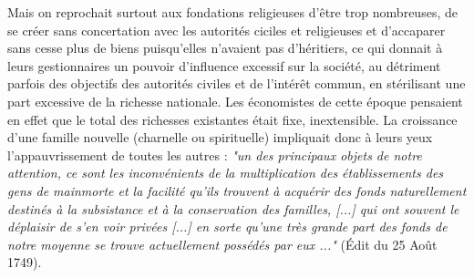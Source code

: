  Mais on reprochait surtout aux fondations religieuses d'être trop nombreuses, de se créer sans concertation avec les autorités ciciles et religieuses et d'accaparer sans cesse plus de biens puisqu'elles n'avaient pas d'héritiers, ce qui donnait à leurs gestionnaires un pouvoir d'influence excessif sur la société, au détriment parfois des objectifs des autorités civiles et de l'intérêt commun, en stérilisant une part excessive de la richesse nationale. Les économistes de cette époque pensaient en effet que le total des richesses existantes était fixe, inextensible. La croissance d'une famille nouvelle (charnelle ou spirituelle) impliquait donc à leurs yeux l'appauvrissement de toutes les autres : \emph{"un des principaux objets de notre attention, ce sont les inconvénients de la multiplication des établissements des gens de mainmorte et la facilité qu'ils trouvent à acquérir des fonds naturellement destinés à la subsistance et à la conservation des familles, \emph{[...]} qui ont souvent le déplaisir de s'en voir privées \emph{[...]} en sorte qu'une très grande part des fonds de notre moyenne se trouve actuellement possédés par eux ..."} (Édit du 25 Août 1749). 

